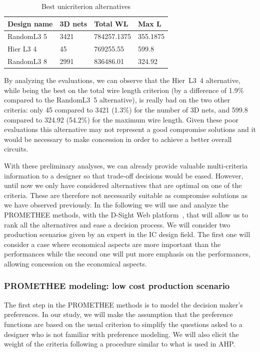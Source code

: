 \documentclass{svmult}
\begin{document}
\begin{table}[h!]
    \begin{center}
        \caption{Best unicriterion alternatives}
        \label{tab:bestunicritalt}
        \begin{tabular}{p{2.3cm}p{1.5cm}p{2cm}p{1.3cm}}
            \hline
            Design name & 3D nets & Total WL & Max L\\
            \hline
            RandomL3 5 & 3421 & 784257.1375 & 355.1875 \\
            Hier L3 4 & 45 & 769255.55 & 599.8 \\
            RandomL3 8 & 2991 & 836486.01 & 324.92 \\
            \hline
        \end{tabular}
    \end{center}
\end{table}

By analyzing the evaluations, we can observe that the Hier~L3~4 alternative, while being the best on the total wire length criterion (by a difference of 1.9\% compared to the RandomL3~5 alternative), is really bad on the two other criteria: only 45 compared to 3421 (1.3\%) for the number of 3D nets, and 599.8 compared to 324.92 (54.2\%) for the maximum wire length. Given these poor evaluations this alternative may not represent a good compromise solutions and it would be necessary to make concession in order to achieve a better overall circuits.

With these preliminary analyses, we can already provide valuable multi-criteria information to a designer so that trade-off decisions would be eased. However, until now we only have considered alternatives that are optimal on one of the criteria. These are therefore not necessarily suitable as compromise solutions as we have observed previously. In the following we will use and analyze the PROMETHEE methods, with the D-Sight Web platform~\cite{dsightweb,Hayez}, that will allow us to rank all the alternatives and ease a decision process. We will consider two production scenarios given by an expert in the IC design field. The first one will consider a case where economical aspects are more important than the performances while the second one will put more emphasis on the performances, allowing concession on the economical aspects.

\subsubsection{PROMETHEE modeling: low cost production scenario}
The first step in the PROMETHEE methods is to model the decision maker's preferences. In our study, we will make the assumption that the preference functions are based on the usual criterion to simplify the questions asked to a designer who is not familiar with preference modeling. We will also elicit the weight of the criteria following a procedure similar to what is used in AHP.
\end{document}
